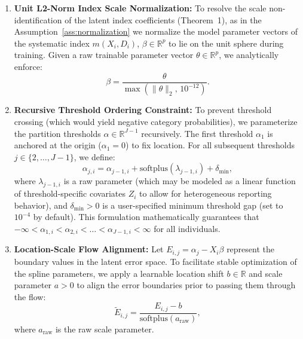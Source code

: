 \documentclass{article}
\numberwithin{figure}{section}
\numberwithin{table}{section}
\numberwithin{equation}{section}
\begin{document}
\begin{enumerate}
  \item \textbf{Unit L2-Norm Index Scale Normalization:} To resolve the scale non-identification of the latent index coefficients (Theorem~1), as in the Assumption~\ref{ass:normalization} we normalize the model parameter vectors of the systematic index $m(X_i, D_{i})$, $\beta \in \mathbb{R}^p$ to lie on the unit sphere during training. Given a raw trainable parameter vector $\theta \in \mathbb{R}^p$, we analytically enforce:
    \begin{equation}
    \beta = \frac{\theta}{\max\left(\|\theta\|_2, \, 10^{-12}\right)}.
    \end{equation}

    \item \textbf{Recursive Threshold Ordering Constraint:} To prevent threshold crossing (which would yield negative category probabilities), we parameterize the partition thresholds $\alpha \in \mathbb{R}^{J-1}$ recursively. The first threshold $\alpha_1$ is anchored at the origin ($\alpha_1 = 0$) to fix location. For all subsequent thresholds $j \in \{2, \dots, J-1\}$, we define:
    \begin{equation}
    \alpha_{j, i} = \alpha_{j-1, i} + \text{softplus}(\lambda_{j-1, i}) + \delta_{\text{min}},
    \end{equation}
    where $\lambda_{j-1, i}$ is a raw parameter (which may be modeled as a linear function of threshold-specific covariates $Z_i$ to allow for heterogeneous reporting behavior), and $\delta_{\text{min}} > 0$ is a user-specified minimum threshold gap (set to $10^{-4}$ by default). This formulation mathematically guarantees that $-\infty < \alpha_{1,i} < \alpha_{2,i} < \dots < \alpha_{J-1,i} < \infty$ for all individuals.

    \item \textbf{Location-Scale Flow Alignment:} Let $E_{i,j} = \alpha_j - X_i \beta$ represent the boundary values in the latent error space. To facilitate stable optimization of the spline parameters, we apply a learnable location shift $b \in \mathbb{R}$ and scale parameter $a > 0$ to align the error boundaries prior to passing them through the flow:
    \begin{equation}
    \tilde{E}_{i,j} = \frac{E_{i,j} - b}{\text{softplus}(a_{\text{raw}})},
    \end{equation}
    where $a_{\text{raw}}$ is the raw scale parameter.


\end{enumerate}
\end{document}
